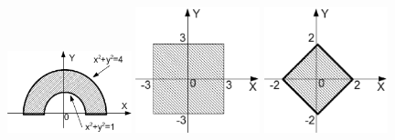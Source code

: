 \begin{figure}[h]%
\begin{floatrow}[3]
{\includegraphics[width=0.32\textwidth,keepaspectratio]{img/ris_3_64}}
{\includegraphics[width=0.32\textwidth,keepaspectratio]{img/ris_3_65}}
{\includegraphics[width=0.32\textwidth,keepaspectratio]{img/ris_3_66}}
\end{floatrow}
\end{figure}%

